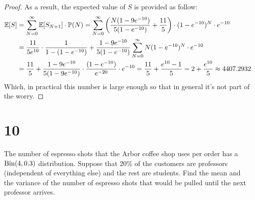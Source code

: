 \documentclass{article}
\begin{document}
\begin{proof}
    As a result, the expected value of $S$ is provided as follow:
    \begin{align}
        \mathbb{E}[S] &= \sum_{N=0}^{\infty}\mathbb{E}[S_{N+1}]\cdot\mathbb{P}(N) = \sum_{N=0}^{\infty}\left(\frac{N(1-9e^{-10})}{5(1-e^{-10})}+\frac{11}{5}\right)\cdot (1-e^{-10})^N\cdot e^{-10}\\
        &= \frac{11}{5e^{10}}\cdot\frac{1}{1-(1-e^{-10})} + \frac{1-9e^{-10}}{5(1-e^{-10})}\sum_{N=0}^{\infty}N(1-e^{-10})^N\cdot e^{-10}\\
        &= \frac{11}{5} + \frac{1-9e^{-10}}{5(1-9e^{-10})}\cdot\frac{(1-e^{-10})}{e^{-20}}\cdot e^{-10} = \frac{11}{5}+\frac{e^{10}-1}{5} = 2+\frac{e^{10}}{5}\approx 4407.2932
    \end{align}
    Which, in practical this number is large enough so that in general it's not part of the worry.
\end{proof}

\newpage

\section*{10}
\begin{ques}\label{q10}
    The number of espresso shots that the Arbor coffee shop uses per order has a $\mathrm{Bin}(4,0.3)$ distribution. Suppose that $20\%$ of the customers are professors (independent of everything else) and the rest are students. Find the mean and the variance of the number of espresso shots that would be pulled until the next professor arrives.
\end{ques}
\end{document}

